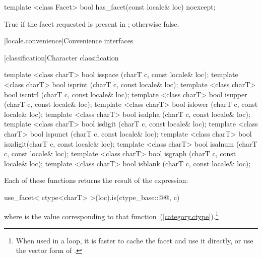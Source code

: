 %
\begin{itemdecl}
template <class Facet> bool has_facet(const locale& loc) noexcept;
\end{itemdecl}

\begin{itemdescr}
\pnum
\returns
True if the facet requested is present in ; otherwise false.
\end{itemdescr}

[locale.convenience]{Convenience interfaces}

[classification]{Character classification}

%
%
%
%
%
%
%
%
%
%
%
%
\begin{itemdecl}
template <class charT> bool isspace (charT c, const locale& loc);
template <class charT> bool isprint (charT c, const locale& loc);
template <class charT> bool iscntrl (charT c, const locale& loc);
template <class charT> bool isupper (charT c, const locale& loc);
template <class charT> bool islower (charT c, const locale& loc);
template <class charT> bool isalpha (charT c, const locale& loc);
template <class charT> bool isdigit (charT c, const locale& loc);
template <class charT> bool ispunct (charT c, const locale& loc);
template <class charT> bool isxdigit(charT c, const locale& loc);
template <class charT> bool isalnum (charT c, const locale& loc);
template <class charT> bool isgraph (charT c, const locale& loc);
template <class charT> bool isblank (charT c, const locale& loc);
\end{itemdecl}

\pnum
Each of these functions
returns the result of the expression:

\begin{codeblock}
use_facet< ctype<charT> >(loc).is(ctype_base::@@, c)
\end{codeblock}

where  is the
value corresponding to that function~(\ref{category.ctype}).\footnote{When
used in a loop, it is faster to cache the
facet and use it directly, or use the vector form of
.}

